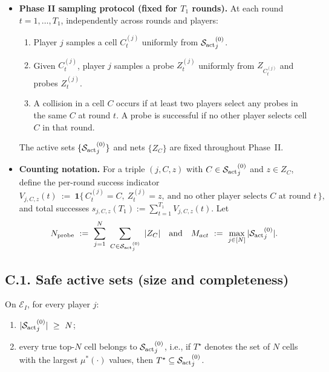 \begin{itemize}
\begin{equation}
\ \le\ C_d\,\Bigl(\frac{h}{\eta}\Bigr)^{\!d},
\end{equation}
where $c_d:=(2+\sqrt d)^{d}$ and $C_d:=\max\{c_d,2^d\}$ is an absolute constant depending only on $d$. For simplicity we use the conservative bound $|Z_C|\le C_d (h/\eta)^d$ below.
Define $P_{\max}:=\max_{C\in\Pcal}|Z_C|$, so $P_{\max}\le C_d (h/\eta)^d$.
\item \textbf{Phase II sampling protocol (fixed for $T_1$ rounds).}
At each round $t=1,\dots,T_1$, independently across rounds and players:
\begin{enumerate}
\item Player $j$ samples a cell $C_t^{(j)}$ uniformly from ${\mathcal{S}_{\mathrm{act}}}^{(0)}_j$.
\item Given $C_t^{(j)}$, player $j$ samples a probe $Z_t^{(j)}$ uniformly from $Z_{C_t^{(j)}}$ and probes $Z_t^{(j)}$.
\item A collision in a cell $C$ occurs if at least two players select any probes in the same $C$ at round $t$.
A probe is successful if no other player selects cell $C$ in that round.
\end{enumerate}
The active sets $\{{\mathcal{S}_{\mathrm{act}}}^{(0)}_j\}$ and nets $\{Z_C\}$ are fixed throughout Phase~II.
\item \textbf{Counting notation.} For a triple $(j,C,z)$ with $C\in {\mathcal{S}_{\mathrm{act}}}^{(0)}_j$ and $z\in Z_C$, define the per-round success indicator
\[
V_{j,C,z}(t)\ :=\ \mathbf 1\{\, C_t^{(j)}=C,\ Z_t^{(j)}=z,\ \text{and no other player selects }C\text{ at round }t\,\},
\]
and total successes $s_{j,C,z}(T_1):=\sum_{t=1}^{T_1} V_{j,C,z}(t)$.
Let
\[
\NumProbes \ :=\ \sum_{j=1}^N\ \sum_{C\in \Sact^{(0)}_j}\ |Z_C|
\quad\text{and}\quad
M_{act} \ :=\ \max_{j\in[N]} |\Sact^{(0)}_j|.
\]
\end{itemize}

\subsection*{C.1.\; Safe active sets (size and completeness)}

\begin{lemma}\label{lem:active-safety}
On $\mathcal E_I$, for every player $j$:
\begin{enumerate}
\item $|\Sact^{(0)}_j|\ \ge\ N$;
\item every true top-$N$ cell belongs to ${\mathcal{S}_{\mathrm{act}}}^{(0)}_j$, i.e., if $T^\star$ denotes the set of $N$ cells with the largest $\mu^\ast(\cdot)$ values, then $T^\star\subseteq {\mathcal{S}_{\mathrm{act}}}^{(0)}_j$.
\end{enumerate}
\end{lemma}


